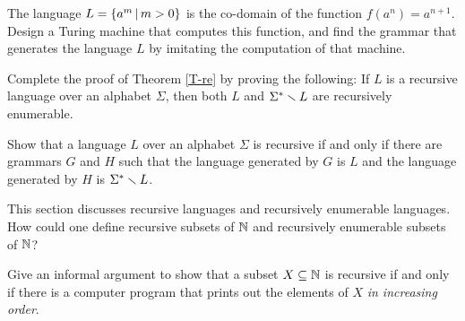 \begin{exercises}

\problem The language $L=\{a^m\,|\, m>0\}$ is the co-domain of the function
$f(a^n)=a^{n+1}$.  Design a Turing machine that computes this function,
and find the grammar that generates the language $L$ by
imitating the computation of that machine.

\problem Complete the proof of Theorem \ref{T-re} by proving
the following:  If $L$ is a recursive language over an
alphabet $\Sigma$, then both
$L$ and $\Sigma^*\smallsetminus L$ are recursively enumerable.

\problem Show that a language $L$ over an alphabet $\Sigma$
is recursive if and only if there are grammars $G$
and $H$ such that the language generated by $G$ is $L$ and the
language generated by $H$ is $\Sigma^*\smallsetminus L$.

\problem This section discusses recursive languages and recursively
enumerable languages.  How could one define recursive subsets of
${\mathbb N}$ and recursively enumerable subsets of ${\mathbb N}$?

\problem Give an informal argument to show that a subset $X\subseteq{\mathbb N}$ is
recursive if and only if there is a computer program
that prints out the elements of $X$ {\it in increasing order}.

\end{exercises}

